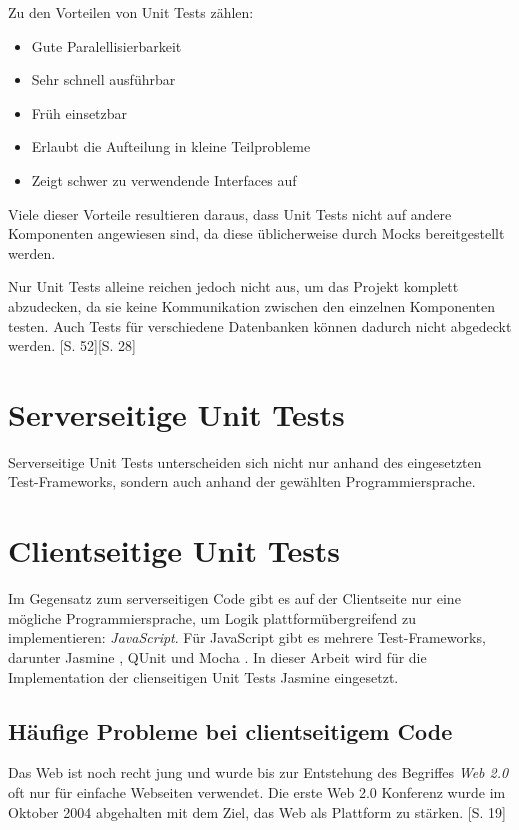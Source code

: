 \documentclass[a4paper,bibtotoc,oneside]{scrbook}
\begin{document}
Zu den Vorteilen von Unit Tests zählen:

\begin{itemize}
	\item Gute Paralellisierbarkeit
	\item Sehr schnell ausführbar
	\item Früh einsetzbar
	\item Erlaubt die Aufteilung in kleine Teilprobleme
	\item Zeigt schwer zu verwendende Interfaces auf
\end{itemize}

Viele dieser Vorteile resultieren daraus, dass Unit Tests nicht auf andere Komponenten angewiesen sind, da diese üblicherweise durch Mocks bereitgestellt werden. 

Nur Unit Tests alleine reichen jedoch nicht aus, um das Projekt komplett abzudecken, da sie keine Kommunikation zwischen den einzelnen Komponenten testen. Auch Tests für verschiedene Datenbanken können dadurch nicht abgedeckt werden. \cite{test_large_systems}[S. 52]\cite{betrieb}[S. 28]

\section{Serverseitige Unit Tests}
Serverseitige Unit Tests unterscheiden sich nicht nur anhand des eingesetzten Test-Frameworks, sondern auch anhand der gewählten Programmiersprache. 


\section{Clientseitige Unit Tests}
Im Gegensatz zum serverseitigen Code gibt es auf der Clientseite nur eine mögliche Programmiersprache, um Logik plattformübergreifend zu implementieren: \emph{JavaScript}. Für JavaScript gibt es mehrere Test-Frameworks, darunter Jasmine \cite{jasmine}, QUnit \cite{qunit} und Mocha \cite{mocha}.
In dieser Arbeit wird für die Implementation der clienseitigen Unit Tests Jasmine eingesetzt.

\subsection{Häufige Probleme bei clientseitigem Code}
Das Web ist noch recht jung und wurde bis zur Entstehung des Begriffes \emph{Web 2.0} oft nur für einfache Webseiten verwendet. Die erste Web 2.0 Konferenz wurde im Oktober 2004 abgehalten mit dem Ziel, das Web als Plattform zu stärken. \cite{web2}[S. 19]
\end{document}
